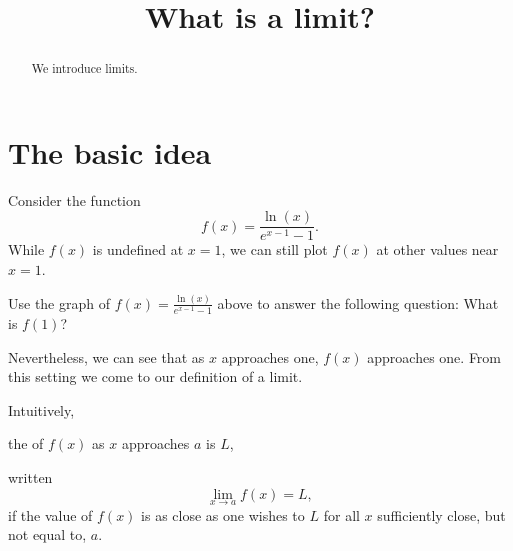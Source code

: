 \documentclass{ximera}
\title[Dig-In:]{What is a limit?}
\begin{document}
\begin{abstract}
  We introduce limits.
\end{abstract}
\maketitle

\section{The basic idea}

Consider the function
\[
f(x) = \frac{\ln(x)}{e^{x-1}-1}.
\]
While $f(x)$ is undefined at $x=1$, we can still plot $f(x)$ at other
values near $x = 1$.
\begin{image}
\end{image}

\begin{question}
  Use the graph of $f(x) = \frac{\ln(x)}{e^{x-1}-1}$ above to answer the
  following question: What is $f(1)$?
  \begin{multipleChoice}
  \end{multipleChoice}
\end{question}

Nevertheless, we can see that as $x$ approaches one, $f(x)$
approaches one. From this setting we come to our definition of a
limit.

\begin{definition}
  Intuitively,
  \begin{center}
    the  of $f(x)$ as $x$ approaches $a$ is $L$,
  \end{center}
  written
  \[
  \lim_{x\to a} f(x) = L,
  \]
  if the value of $f(x)$ is as close as one wishes to $L$ for
  all $x$ sufficiently close, but not equal to, $a$.
\end{definition}
\end{document}
